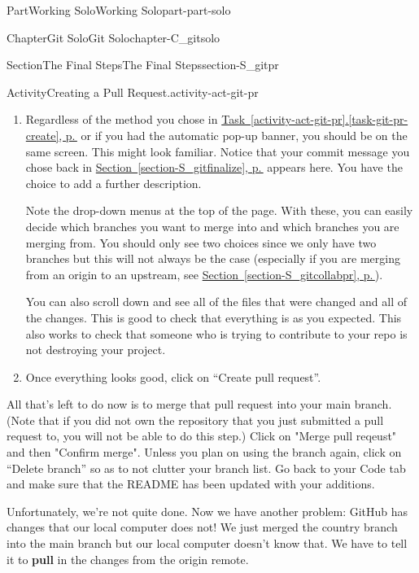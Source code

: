 \documentclass[twoside,10pt,]{book}
\newcommand{\xreffont}{\relax}
\newcommand{\terminology}[1]{\textbf{#1}}
\begin{document}
\begin{partptx}{Part}{Working Solo}{}{Working Solo}{}{}{part-part-solo}
\begin{chapterptx}{Chapter}{Git Solo}{}{Git Solo}{}{}{chapter-C_gitsolo}
\begin{sectionptx}{Section}{The Final Steps}{}{The Final Steps}{}{}{section-S_gitpr}
\begin{activity}{Activity}{Creating a Pull Request.}{activity-act-git-pr}
\begin{enumerate}[font=\bfseries,label=(\alph*),ref=\alph*]
\begin{enumerate}
\item{}Navigate to the Pull requests tab. Click on the button near the top right that says ``New pull request''. Select the branch you want to pull into main from either the ``Compare'' drop-down menu at the top or the example comparisons table. Click ``Create pull request''.%
\end{enumerate}
%
\item\label{task-git-pr-open}Regardless of the method you chose in \hyperref[task-git-pr-create]{Task~{\xreffont\ref{activity-act-git-pr}}.{\xreffont\ref{task-git-pr-create}}, p.\,\pageref{task-git-pr-create}} or if you had the automatic pop-up banner, you should be on the same screen. This might look familiar. Notice that your commit message you chose back in \hyperref[section-S_gitfinalize]{Section~{\xreffont\ref{section-S_gitfinalize}}, p.\,\pageref{section-S_gitfinalize}} appears here. You have the choice to add a further description.%
\par
Note the drop-down menus at the top of the page. With these, you can easily decide which branches you want to merge into and which branches you are merging from. You should only see two choices since we only have two branches but this will not always be the case (especially if you are merging from an origin to an upstream, see \hyperref[section-S_gitcollabpr]{Section~{\xreffont\ref{section-S_gitcollabpr}}, p.\,\pageref{section-S_gitcollabpr}}).%
\par
You can also scroll down and see all of the files that were changed and all of the changes. This is good to check that everything is as you expected. This also works to check that someone who is trying to contribute to your repo is not destroying your project.%
\item{}Once everything looks good, click on ``Create pull request''.%
\end{enumerate}%
All that's left to do now is to merge that pull request into your main branch. (Note that if you did not own the repository that you just submitted a pull request to, you will not be able to do this step.) Click on "Merge pull reqeust" and then "Confirm merge". Unless you plan on using the branch again, click on ``Delete branch'' so as to not clutter your branch list. Go back to your Code tab and make sure that the README has been updated with your additions.%
\end{activity}%
 Unfortunately, we're not quite done. Now we have another problem: GitHub has changes that our local computer does not! We just merged the country branch into the main branch but our local computer doesn't know that. We have to tell it to \terminology{pull} in the changes from the origin remote.%

\end{sectionptx}
\end{chapterptx}
\end{partptx}
\end{document}
